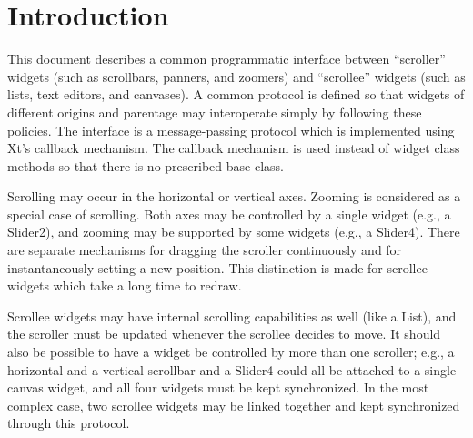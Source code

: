 
%
% 

\setlength{\textheight}{22.5cm}
\setlength{\textwidth}{16.5cm}
\setlength{\footheight}{0.0mm}
\setlength{\topmargin}{6.5mm}
\setlength{\headheight}{0.0mm}
\setlength{\headsep}{0.0mm}
\setlength{\oddsidemargin}{-5.0mm}
\setlength{\parindent}{1pc}



\FWFlocation{}

\date{\today}

\FWFtitlepage{}

\section{Introduction}

This document describes a common programmatic interface between
``scroller'' widgets (such as scrollbars, panners, and zoomers) and
``scrollee'' widgets (such as lists, text editors, and canvases).  A
common protocol is defined so that widgets of different origins and
parentage may interoperate simply by following these policies.  The
interface is a message-passing protocol which is implemented using
Xt's callback mechanism.  The callback mechanism is used instead of
widget class methods so that there is no prescribed base class.

Scrolling may occur in the horizontal or vertical axes.  Zooming is
considered as a special case of scrolling.  Both axes may be
controlled by a single widget (e.g., a Slider2), and zooming may be
supported by some widgets (e.g., a Slider4).  There are separate
mechanisms for dragging the scroller continuously and for
instantaneously setting a new position.  This distinction is made for
scrollee widgets which take a long time to redraw.

Scrollee widgets may have internal scrolling capabilities as well
(like a List), and the scroller must be updated whenever the scrollee
decides to move.  It should also be possible to have a widget be
controlled by more than one scroller; e.g., a horizontal and a
vertical scrollbar and a Slider4 could all be attached to a single
canvas widget, and all four widgets must be kept synchronized.  In the
most complex case, two scrollee widgets may be linked together and
kept synchronized through this protocol.

